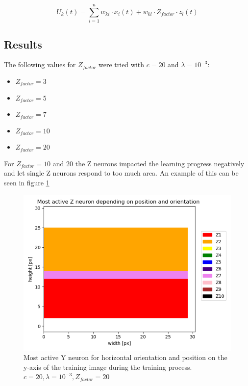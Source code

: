 \begin{equation}
\label{eqn:ukHorvert}
U_k(t) = \sum_{i=1}^n w_{ki} \cdot x_i(t) + w_{kl} \cdot Z_{factor} \cdot z_l(t)
\end{equation}

\subsection{Results} 

The following values for $Z_{factor} $ were tried with $c = 20$ and $\lambda = 10^{-3}$:
\begin{itemize}
  \item $Z_{factor} = 3$
  \item $Z_{factor} = 5$
  \item $Z_{factor} = 7$  
  \item $Z_{factor} = 10$ 
  \item $Z_{factor} = 20$
\end{itemize}

For $Z_{factor} = 10$ and $20$ the Z neurons impacted the learning progress negatively and let single Z neurons respond to too much area. An example of this can be seen in figure \ref{fig:horvert_c20_3_Zfactor20_horizontalLines}

\begin{figure}
  \includegraphics[width=\linewidth]{figures/horvert/horvert_c20_3_Zfactor20_horizontalLines.png}
  \caption{Most active Y neuron for horizontal orientation and position on the y-axis of the training image during the training process. $c = 20, \lambda = 10^{-3}, Z_{factor} = 20$}
  \label{fig:horvert_c20_3_Zfactor20_horizontalLines}
\end{figure}


